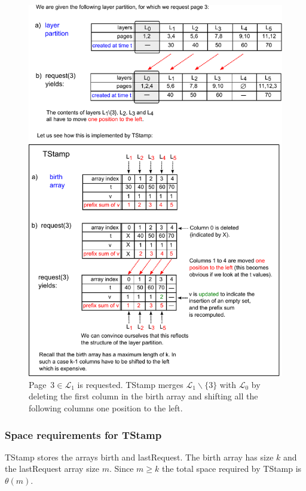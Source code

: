 \documentclass[a4paper,12pt, titlepage]{article}  %
\newcommand{\cl}{\mathcal{L}}   %
\begin{document}
\begin{figure}[htp]
	\centering
	\includegraphics[scale=1.0]{./figures/TStamp_deleteLayer.pdf}
	\caption{Page~$3 \in \cl_1$ is requested. TStamp merges $\cl_1 \backslash \{3\}$ with $\cl_0$ by deleting the first column in the birth array
                     and shifting all the following columns one position to the left.} 
	\label{fig:TStamp_deleteLayer}
\end{figure}



\subsubsection{Space requirements for TStamp}
TStamp stores the arrays birth and lastRequest. The birth array has size $k$ and the lastRequest array size $m$. 
Since $m \geq k$ the total space required by TStamp is $\theta(m)$.
\end{document}
